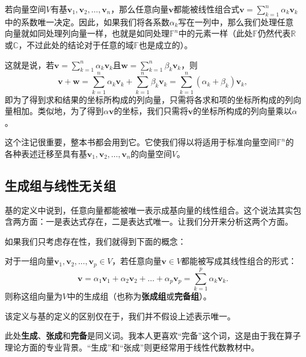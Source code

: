\begin{remark}\label{remark:fn_to_abstract}
    若向量空间$V$有基$\mathbf{v}_{1},\mathbf{v}_{2},\ldots,\mathbf{v}_{n}$，那么任意向量$\mathbf{v}$都能被线性组合式$\mathbf{v}=\sum_{k=1}^{n}\alpha_{k}\mathbf{v}_{k}$中的系数唯一决定。因此，如果我们将各系数$\alpha_k$写在一列中，那么我们处理任意向量就如同处理列向量一样，也就是如同处理$\mathbb{F}^n$中的元素一样（此处$\mathbb{F}$仍然代表$\mathbb{R}$或$\mathbb{C}$，不过此处的结论对于任意的域$\mathbb{F}$也是成立的）。

    这就是说，若$\mathbf{v}=\sum_{k=1}^{n}\alpha_{k}\mathbf{v}_{k}$且$\mathbf{w}=\sum_{k=1}^{n}\beta_{k}\mathbf{v}_{k}$，则
    \[\mathbf{v}+\mathbf{w}=\sum_{k=1}^n\alpha_k\mathbf{v}_k+\sum_{k=1}^n\beta_k\mathbf{v}_k=\sum_{k=1}^n(\alpha_k+\beta_k)\mathbf{v}_k,\]
    即为了得到求和结果的坐标所构成的列向量，只需将各求和项的坐标所构成的列向量相加。类似地，为了得到$\alpha\mathbf{v}$的坐标，我们只需将$\mathbf{v}$的坐标所构成的列向量乘以$\alpha$。
\end{remark}

这个注记很重要，整本书都会用到它。它使我们得以将适用于标准向量空间$\mathbb{F}^n$的各种表述迁移至具有基$\mathbf{v}_{1},\mathbf{v}_{2},\ldots,\mathbf{v}_{n}$的向量空间$V$。

\subsection{生成组与线性无关组}

基的定义中说到，任意向量都能被唯一表示成基向量的线性组合。这个说法其实包含两方面：一是表达式存在，二是表达式唯一。让我们分开来分析这两个方面。

如果我们只考虑存在性，我们就得到下面的概念：

\begin{definition}
    对于一组向量$\mathbf{v}_{1},\mathbf{v}_{2},\ldots,\mathbf{v}_{p}\in V$，若任意向量$\mathbf{v}\in V$都能被写成其线性组合的形式：\[\mathbf{v}=\alpha_1\mathbf{v}_1+\alpha_2\mathbf{v}_2+\ldots+\alpha_p\mathbf{v}_p=\sum_{k=1}^p\alpha_k\mathbf{v}_k.\]
    则称这组向量为$V$中的生成组（也称为{\bf 张成组}或{\bf 完备组}）。
\end{definition}

该定义与基的定义的区别仅在于，我们并不假设上述表示唯一。

此处{\bf 生成}、{\bf 张成}和{\bf 完备}是同义词。我本人更喜欢“完备”这个词，这是由于我在算子理论方面的专业背景。“生成”和“张成”则更经常用于线性代数教材中。


